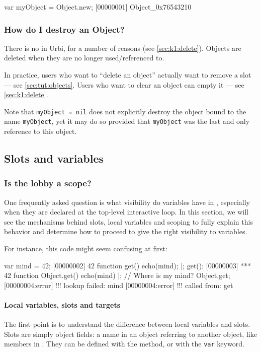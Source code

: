 \begin{urbiscript}
var myObject = Object.new;
[00000001] Object_0x76543210
\end{urbiscript}

\subsubsection{How do I destroy an Object?}
There is no  in Urbi, for a number of reasons (see
\autoref{sec:k1:delete}).  Objects are deleted when they are no longer
used/referenced to.

In practice, users who want to ``delete an object'' actually want to remove
a slot --- see \autoref{sec:tut:objects}.  Users who want to clear an object
can empty it --- see \autoref{sec:k1:delete}.

Note that \lstinline{myObject = nil} does not explicitly destroy the
object bound to the name \lstinline{myObject}, yet it may do
so provided that \lstinline{myObject} was the last and only reference
to this object.

\subsection{Slots and variables}

\subsubsection{Is the lobby a scope?}

One frequently asked question is what visibility do variables have in
\us, especially when they are declared at the top-level interactive
loop.  In this section, we will see the mechanisms behind slots, local
variables and scoping to fully explain this behavior and determine how
to proceed to give the right visibility to variables.

For instance, this code might seem confusing at first:

\begin{urbiscript}
var mind = 42;
[00000002] 42
function get()
{
  echo(mind);
}|;
get();
[00000003] *** 42
function Object.get()
{
  echo(mind)
}|;
// Where is my mind?
Object.get;
[00000004:error] !!! lookup failed: mind
[00000004:error] !!!    called from: get
\end{urbiscript}

\paragraph{Local variables, slots and targets}
The first point is to understand the difference between local variables and
slots. Slots are simply object fields: a name in an object referring to
another object, like members in \Cxx. They can be defined with the
 method, or with the \lstinline|var| keyword.

